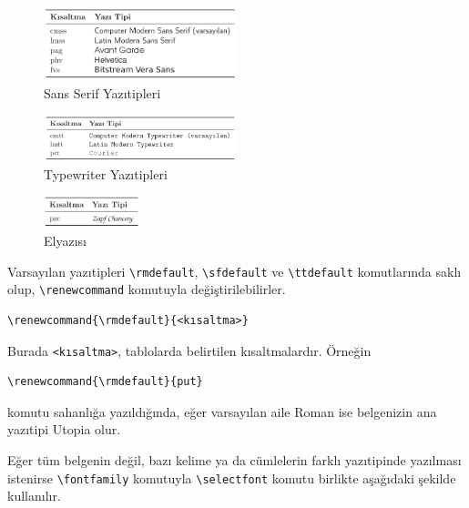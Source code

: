 \documentclass[
  10pt,
]{scrbook}
\theoremstyle{definition}
\theoremstyle{definition}
\theoremstyle{definition}
\theoremstyle{definition}
\theoremstyle{remark}
\begin{document}
\begin{figure}
\centering
\includegraphics[width=0.5\textwidth,height=\textheight]{images/yazitipi3.png}
\caption{Sans Serif Yazıtipleri}
\end{figure}

\begin{figure}
\centering
\includegraphics[width=0.5\textwidth,height=\textheight]{images/yazitipi4.png}
\caption{Typewriter Yazıtipleri\\
}
\end{figure}

\begin{figure}
\centering
\includegraphics[width=0.25\textwidth,height=\textheight]{images/yazitipi5.png}
\caption{Elyazısı}
\end{figure}

Varsayılan yazıtipleri \texttt{\textbackslash{}rmdefault}, \texttt{\textbackslash{}sfdefault} ve \texttt{\textbackslash{}ttdefault} komutlarında saklı olup, \texttt{\textbackslash{}renewcommand} komutuyla değiştirilebilirler.

\begin{verbatim}
\renewcommand{\rmdefault}{<kısaltma>}
\end{verbatim}

Burada \texttt{\textless{}kısaltma\textgreater{}}, tablolarda belirtilen kısaltmalardır. Örneğin

\begin{verbatim}
\renewcommand{\rmdefault}{put}
\end{verbatim}

komutu sahanlığa yazıldığında, eğer varsayılan aile Roman ise belgenizin ana yazıtipi Utopia olur.

Eğer tüm belgenin değil, bazı kelime ya da cümlelerin farklı yazıtipinde yazılması istenirse \texttt{\textbackslash{}fontfamily} komutuyla \texttt{\textbackslash{}selectfont} komutu birlikte aşağıdaki şekilde kullanılır.
\end{document}
